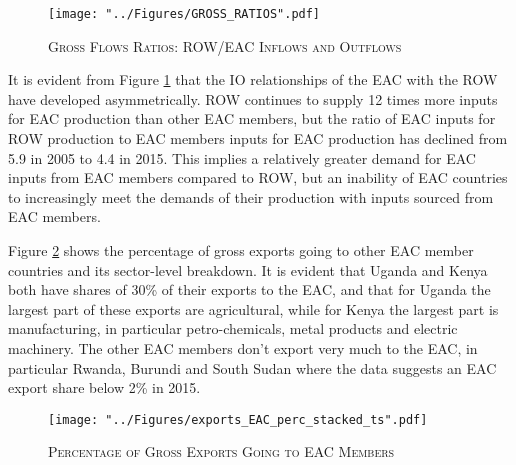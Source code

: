 \documentclass[a4paper]{article}
\begin{document}
\begin{figure}[h!]
\centering
\caption{\label{fig:GR}\textsc{Gross Flows Ratios: ROW/EAC Inflows and Outflows}}
\texttt{[image: "../Figures/GROSS\_RATIOS".pdf]} %
\end{figure}
\FloatBarrier

It is evident from Figure \ref{fig:GR} that the IO relationships of the EAC with the ROW have developed asymmetrically. ROW continues to supply 12 times more inputs for EAC production than other EAC members, but the ratio of EAC inputs for ROW production to EAC members inputs for EAC production has declined from 5.9 in 2005 to 4.4 in 2015. This implies a relatively greater demand for EAC inputs from EAC members compared to ROW, but an inability of EAC countries to increasingly meet the demands of their production with inputs sourced from EAC members. \newline


Figure \ref{fig:exp_EAC_share} shows the percentage of gross exports going to other EAC member countries and its sector-level breakdown. It is evident that Uganda and Kenya both have shares of 30\% of their exports to the EAC, and that for Uganda the largest part of these exports are agricultural, while for Kenya the largest part is manufacturing, in particular petro-chemicals, metal products and electric machinery. The other EAC members don't export very much to the EAC, in particular Rwanda, Burundi and South Sudan where the data suggests an EAC export share below 2\% in 2015. 

\begin{figure}[h!]
\centering
\caption{\label{fig:exp_EAC_share}\textsc{Percentage of Gross Exports Going to EAC Members}}
\texttt{[image: "../Figures/exports\_EAC\_perc\_stacked\_ts".pdf]} %
\end{figure}
\FloatBarrier



\end{document}
